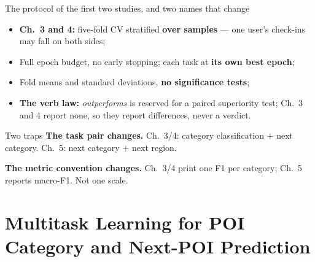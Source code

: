 \documentclass{beamer}
\begin{document}
\begin{frame}{The protocol of the first two studies, and two names that change}
    \begin{itemize}
        \item \textbf{Ch.~3 and 4:} five-fold CV stratified \textbf{over samples} ---
              \alert{one user's check-ins may fall on both sides};
        \item Full epoch budget, no early stopping; each task at \textbf{its own best epoch};
        \item Fold means and standard deviations, \textbf{no significance tests};
        \item \textbf{The verb law:} \emph{outperforms} is reserved for a paired superiority
              test; Ch.~3 and 4 report none, so they report differences, never a verdict.
    \end{itemize}

    \bigskip
    \begin{alertblock}{Two traps}
        \small
        \textbf{The task pair changes.} Ch.~3/4: category classification $+$ next category.
        Ch.~5: next category $+$ next region.\par
        \textbf{The metric convention changes.} Ch.~3/4 print one F1 per category;
        Ch.~5 reports macro-F1. \alert{Not one scale.}
    \end{alertblock}
\end{frame}

\section[MTLnet]{Multitask Learning for POI Category and Next-POI Prediction}
\end{document}
